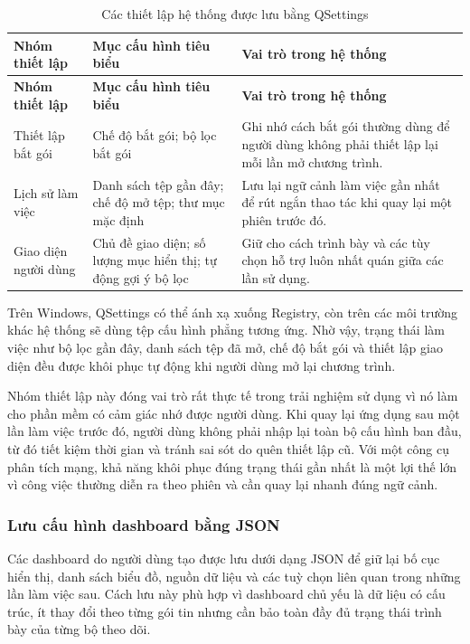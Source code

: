 \documentclass[../DoAn.tex]{subfiles}
\begin{document}
\begin{longtable}{|p{3.6cm}|p{4.1cm}|p{5.5cm}|}
\caption{Các thiết lập hệ thống được lưu bằng QSettings} \label{tab:schema_qsettings} \\
\hline
\textbf{Nhóm thiết lập} & \textbf{Mục cấu hình tiêu biểu} & \textbf{Vai trò trong hệ thống} \\ \hline
\endfirsthead
\hline
\textbf{Nhóm thiết lập} & \textbf{Mục cấu hình tiêu biểu} & \textbf{Vai trò trong hệ thống} \\ \hline
\endhead
\hline
\endfoot
\hline
\endlastfoot
Thiết lập bắt gói & Chế độ bắt gói; bộ lọc bắt gói & Ghi nhớ cách bắt gói thường dùng để người dùng không phải thiết lập lại mỗi lần mở chương trình. \\ \hline
Lịch sử làm việc & Danh sách tệp gần đây; chế độ mở tệp; thư mục mặc định & Lưu lại ngữ cảnh làm việc gần nhất để rút ngắn thao tác khi quay lại một phiên trước đó. \\ \hline
Giao diện người dùng & Chủ đề giao diện; số lượng mục hiển thị; tự động gợi ý bộ lọc & Giữ cho cách trình bày và các tùy chọn hỗ trợ luôn nhất quán giữa các lần sử dụng. \\ \hline
\end{longtable}

Trên Windows, QSettings có thể ánh xạ xuống Registry, còn trên các môi trường khác hệ thống sẽ dùng tệp cấu hình phẳng tương ứng. Nhờ vậy, trạng thái làm việc như bộ lọc gần đây, danh sách tệp đã mở, chế độ bắt gói và thiết lập giao diện đều được khôi phục tự động khi người dùng mở lại chương trình.

Nhóm thiết lập này đóng vai trò rất thực tế trong trải nghiệm sử dụng vì nó làm cho phần mềm có cảm giác nhớ được người dùng. Khi quay lại ứng dụng sau một lần làm việc trước đó, người dùng không phải nhập lại toàn bộ cấu hình ban đầu, từ đó tiết kiệm thời gian và tránh sai sót do quên thiết lập cũ. Với một công cụ phân tích mạng, khả năng khôi phục đúng trạng thái gần nhất là một lợi thế lớn vì công việc thường diễn ra theo phiên và cần quay lại nhanh đúng ngữ cảnh.

\subsubsection{Lưu cấu hình dashboard bằng JSON}
Các dashboard do người dùng tạo được lưu dưới dạng JSON để giữ lại bố cục hiển thị, danh sách biểu đồ, nguồn dữ liệu và các tuỳ chọn liên quan trong những lần làm việc sau. Cách lưu này phù hợp vì dashboard chủ yếu là dữ liệu có cấu trúc, ít thay đổi theo từng gói tin nhưng cần bảo toàn đầy đủ trạng thái trình bày của từng bộ theo dõi.
\end{document}
